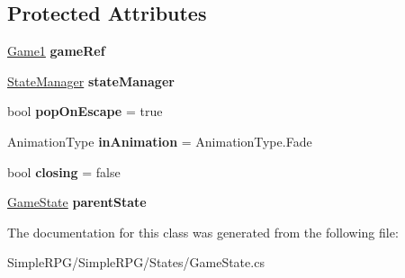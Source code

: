 \subsection*{Protected Attributes}
\begin{DoxyCompactItemize}
\item 
\hypertarget{class_simple_r_p_g_1_1_states_1_1_game_state_abebc6e51f9c375485bc03185a466fe4b}{\hyperlink{class_simple_r_p_g_1_1_game1}{Game1} {\bfseries game\-Ref}}\label{class_simple_r_p_g_1_1_states_1_1_game_state_abebc6e51f9c375485bc03185a466fe4b}

\item 
\hypertarget{class_simple_r_p_g_1_1_states_1_1_game_state_a7ede7a30255b2894fee92cd3dcb9b5fe}{\hyperlink{class_simple_r_p_g_1_1_states_1_1_state_manager}{State\-Manager} {\bfseries state\-Manager}}\label{class_simple_r_p_g_1_1_states_1_1_game_state_a7ede7a30255b2894fee92cd3dcb9b5fe}

\item 
\hypertarget{class_simple_r_p_g_1_1_states_1_1_game_state_ada3000d2cec329e802a0693e2a2a8281}{bool {\bfseries pop\-On\-Escape} = true}\label{class_simple_r_p_g_1_1_states_1_1_game_state_ada3000d2cec329e802a0693e2a2a8281}

\item 
\hypertarget{class_simple_r_p_g_1_1_states_1_1_game_state_a03c7c40f61ca5893d6e5a106e9d9d5a8}{Animation\-Type {\bfseries in\-Animation} = Animation\-Type.\-Fade}\label{class_simple_r_p_g_1_1_states_1_1_game_state_a03c7c40f61ca5893d6e5a106e9d9d5a8}

\item 
\hypertarget{class_simple_r_p_g_1_1_states_1_1_game_state_a3cb05ec585e6744764a94f160efe05ab}{bool {\bfseries closing} = false}\label{class_simple_r_p_g_1_1_states_1_1_game_state_a3cb05ec585e6744764a94f160efe05ab}

\item 
\hypertarget{class_simple_r_p_g_1_1_states_1_1_game_state_a24084ddfaff8f9469c7432fb4be05a1e}{\hyperlink{class_simple_r_p_g_1_1_states_1_1_game_state}{Game\-State} {\bfseries parent\-State}}\label{class_simple_r_p_g_1_1_states_1_1_game_state_a24084ddfaff8f9469c7432fb4be05a1e}

\end{DoxyCompactItemize}


The documentation for this class was generated from the following file\-:\begin{DoxyCompactItemize}
\item 
Simple\-R\-P\-G/\-Simple\-R\-P\-G/\-States/Game\-State.\-cs\end{DoxyCompactItemize}
